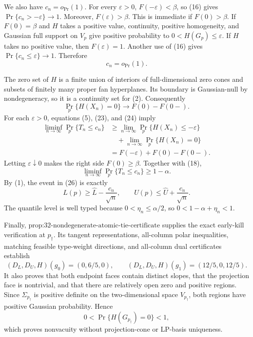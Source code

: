 We also have \(c_n=o_{\Pr}(1)\).  For every \(\varepsilon>0\), \(F(-\varepsilon)<\beta\), so (16) gives \(\Pr\{c_n> -\varepsilon\}\to1\).  Moreover, \(F(\varepsilon)>\beta\).  This is immediate if \(F(0)>\beta\).  If \(F(0)=\beta\) and \(H\) takes a positive value, continuity, positive homogeneity, and Gaussian full support on \(V_p\) give positive probability to \(0<H(G_p)\leq\varepsilon\).  If \(H\) takes no positive value, then \(F(\varepsilon)=1\).  Another use of (16) gives \(\Pr\{c_n\leq\varepsilon\}\to1\).  Therefore
\[
c_n=o_{\Pr}(1).
\tag{24}
\]

The zero set of \(H\) is a finite union of interiors of full-dimensional zero cones and subsets of finitely many proper fan hyperplanes.  Its boundary is Gaussian-null by nondegeneracy, so it is a continuity set for (2).  Consequently
\[
\Pr_p\{H(X_n)=0\}\longrightarrow F(0)-F(0-).
\tag{25}
\]
For each \(\varepsilon>0\), equations (5), (23), and (24) imply
\[
\begin{aligned}
\liminf_{n\to\infty}\Pr_p\{T_n\leq c_n\}
&\geq \lim_{n\to\infty}\Pr_p\{H(X_n)\leq-\varepsilon\}\\
&\quad+\lim_{n\to\infty}\Pr_p\{H(X_n)=0\}\\
&=F(-\varepsilon)+F(0)-F(0-).
\end{aligned}
\]
Letting \(\varepsilon\downarrow0\) makes the right side \(F(0)\geq\beta\).  Together with (18),
\[
\liminf_{n\to\infty}\Pr_p\{T_n\leq c_n\}\geq1-\alpha.
\tag{26}
\]
By (1), the event in (26) is exactly
\[
L(p)\geq\widehat L-\frac{c_n}{\sqrt n},
\qquad
U(p)\leq\widehat U+\frac{c_n}{\sqrt n}.
\]
The quantile level is well typed because \(0<\eta_n\leq\alpha/2\), so \(0<1-\alpha+\eta_n<1\).

Finally, \(\text{prop:32-nondegenerate-atomic-tie-certificate}\) supplies the exact early-kill verification at \(p_\dagger\).  Its tangent representations, all-column polar inequalities, matching feasible type-weight directions, and all-column dual certificates establish
\[
(D_L,D_U,H)(g_0)=(0,6/5,0),
\qquad
(D_L,D_U,H)(g_1)=(12/5,0,12/5).
\]
It also proves that both endpoint faces contain distinct slopes, that the projection face is nontrivial, and that there are relatively open zero and positive regions.  Since \(\Sigma_{p_\dagger}\) is positive definite on the two-dimensional space \(V_{p_\dagger}\), both regions have positive Gaussian probability.  Hence
\[
0<\Pr\{H(G_{p_\dagger})=0\}<1,
\]
which proves nonvacuity without projection-cone or LP-basis uniqueness.